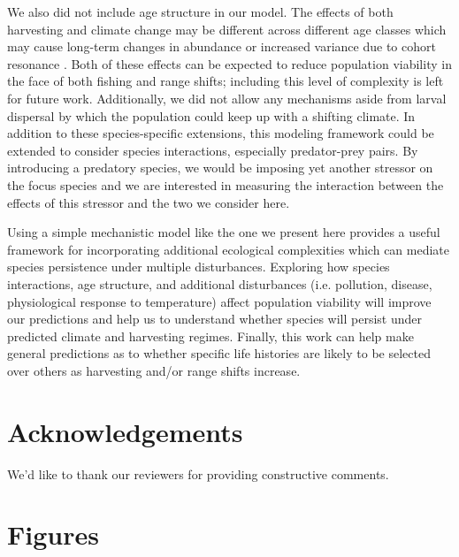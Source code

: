 \documentclass[12pt,english]{article}
\begin{document}
We also did not include age structure in our model. The effects of both harvesting and climate change may be different across different age classes which may cause long-term changes in abundance or increased variance due to cohort resonance \citep{Botsfordetal2011, Rouyeretal2012}. Both of these effects can be expected to reduce population viability in the face of both fishing and range shifts; including this level of complexity is left for future work. Additionally, we did not allow any mechanisms aside from larval dispersal by which the population could keep up with a shifting climate.  In addition to these species-specific extensions, this modeling framework could be extended to consider species interactions, especially predator-prey pairs.  By introducing a predatory species, we would be imposing yet another stressor on the focus species \citep{Lingetal2009, Gurevitchetal2000} and we are interested in measuring the interaction between the effects of this stressor and the two we consider here.

Using a simple mechanistic model like the one we present here provides a useful framework for incorporating additional ecological complexities which can mediate species persistence under multiple disturbances. Exploring how species interactions, age structure, and additional disturbances (i.e. pollution, disease, physiological response to temperature) affect population viability will improve our predictions and help us to understand whether species will persist under predicted climate and harvesting regimes. Finally, this work can help make general predictions as to whether specific life histories are likely to be selected over others as harvesting and/or range shifts increase.


\section*{ Acknowledgements}
We'd like to thank our reviewers for providing constructive comments. 



\section{Figures}
\end{document}
